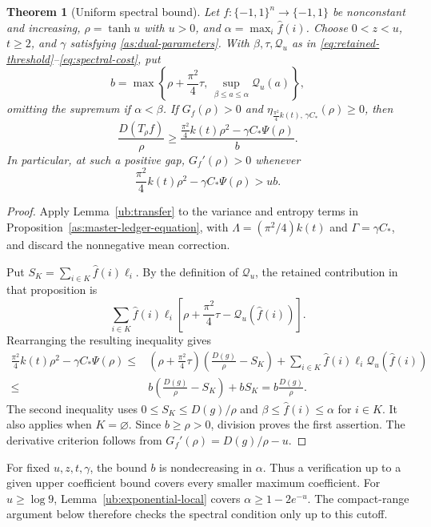 \documentclass[11pt,letterpaper]{amsart}
\newcommand{\1}{\mathbf 1}
\newtheorem{theorem}{Theorem}[section]
\numberwithin{equation}{section}
\begin{document}
\begin{theorem}[Uniform spectral bound]\label{as:gate}
Let $f:\{-1,1\}^n\to\{-1,1\}$ be nonconstant and increasing,
$\rho=\tanh u$ with $u>0$, and
$\alpha=\max_i\widehat f(i)$.
Choose $0<z<u$, $t\ge2$, and $\gamma$ satisfying
\eqref{as:dual-parameters}.
With $\beta,\tau,\mathcal Q_u$ as in
\eqref{eq:retained-threshold}--\eqref{eq:spectral-cost}, put
\[
 b=\max\left\{
       \rho+\frac{\pi^2}{4}\tau,\,
       \sup_{\beta\le a\le\alpha}\mathcal Q_u(a)
       \right\},
\]
omitting the supremum if $\alpha<\beta$.
If $G_f(\rho)>0$ and
$\eta_{\frac{\pi^2}{4}k(t),\,\gamma C_*}(\rho)\ge0$, then
\[
 \frac{D(T_\rho f)}{\rho}
 \ge
 \frac{\frac{\pi^2}{4}k(t)\rho^2-\gamma C_*\Psi(\rho)}{b}.
\]
In particular, at such a positive gap, $G_f'(\rho)>0$ whenever
\[
 \frac{\pi^2}{4}k(t)\rho^2-\gamma C_*\Psi(\rho)>ub.
\]
\end{theorem}

\begin{proof}
Apply Lemma~\ref{ub:transfer} to the variance and entropy terms
in Proposition~\ref{as:master-ledger-equation}, with
$\Lambda=(\pi^2/4)k(t)$ and $\Gamma=\gamma C_*$,
and discard the nonnegative mean correction.

Put $S_K=\sum_{i\in K}\widehat f(i)\ell_i$.
By the definition of $\mathcal Q_u$, the retained contribution
in that proposition is
\[
 \sum_{i\in K}\widehat f(i)\ell_i
 \left[\rho+\frac{\pi^2}{4}\tau
             -\mathcal Q_u(\widehat f(i))\right].
\]
Rearranging the resulting inequality gives
\[
 \begin{aligned}
 \frac{\pi^2}{4}k(t)\rho^2-\gamma C_*\Psi(\rho)
 \le{}&
 \left(\rho+\frac{\pi^2}{4}\tau\right)
       \left(\frac{D(g)}{\rho}-S_K\right)+\sum_{i\in K}\widehat f(i)\ell_i
          \mathcal Q_u(\widehat f(i))\\
 \le{}&
 b\left(\frac{D(g)}{\rho}-S_K\right)+bS_K
 =b\frac{D(g)}{\rho}.
 \end{aligned}
\]
The second inequality uses
$0\le S_K\le D(g)/\rho$ and
$\beta\le\widehat f(i)\le\alpha$ for $i\in K$.
It also applies when $K=\varnothing$.
Since $b\ge\rho>0$, division proves the first assertion.
The derivative criterion follows from
$G_f'(\rho)=D(g)/\rho-u$.
\end{proof}

For fixed $u,z,t,\gamma$, the bound $b$ is nondecreasing in
$\alpha$. Thus a verification up to a given upper coefficient
bound covers every smaller maximum coefficient.
For $u\ge\log9$, Lemma~\ref{ub:exponential-local} covers
$\alpha\ge1-2e^{-u}$.
The compact-range argument below therefore checks the spectral
condition only up to this cutoff.
\end{document}
